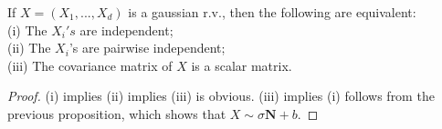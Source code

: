 \documentclass[a4paper]{article}
\begin{document}
\begin{prop}
If $X = (X_1,...,X_d)$ is a gaussian r.v., then the following are equivalent:\\
(i) The $X_i's$ are independent;\\
(ii) The $X_i$'s are pairwise independent;\\
(iii) The covariance matrix of $X$ is a scalar matrix.
\begin{proof}
(i) implies (ii) implies (iii) is obvious. (iii) implies (i) follows from the previous proposition, which shows that $X \sim \sigma \mathbf{N} + b$.
\end{proof}
\end{prop}
\end{document}
